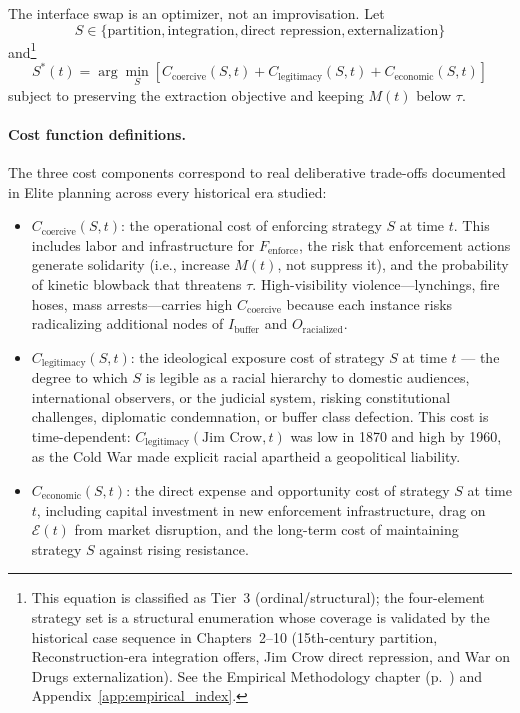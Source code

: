 The interface swap is an optimizer, not an improvisation. Let
\begin{equation}\label{eq:1.6-interface-strategy-set}
S \in \{\text{partition},\text{integration},\text{direct repression},\text{externalization}\}
\end{equation}
and\footnote{This equation is classified as Tier~3 (ordinal/structural); the four-element strategy set is a structural enumeration whose coverage is validated by the historical case sequence in Chapters~2--10 (15th-century partition, Reconstruction-era integration offers, Jim Crow direct repression, and War on Drugs externalization). See the Empirical Methodology chapter (p.~\pageref{ch:empirical_methodology}) and Appendix~\ref{app:empirical_index}.}
\begin{equation}\label{eq:1.7-interface-optimizer}
S^\ast(t) = \arg\min_{S} \left[C_{\text{coercive}}(S,t) + C_{\text{legitimacy}}(S,t) + C_{\text{economic}}(S,t)\right]
\end{equation}
subject to preserving the extraction objective and keeping $M(t)$ below $\tau$.

\paragraph{Cost function definitions.}
The three cost components correspond to real deliberative trade-offs documented in Elite planning across every historical era studied:

\begin{itemize}[leftmargin=*]
    \item $C_{\text{coercive}}(S,t)$: the operational cost of enforcing strategy $S$ at time $t$. This includes labor and infrastructure for $F_{\text{enforce}}$, the risk that enforcement actions generate solidarity (i.e., increase $M(t)$, not suppress it), and the probability of kinetic blowback that threatens $\tau$. High-visibility violence---lynchings, fire hoses, mass arrests---carries high $C_{\text{coercive}}$ because each instance risks radicalizing additional nodes of $I_{\text{buffer}}$ and $O_{\text{racialized}}$.

    \item $C_{\text{legitimacy}}(S,t)$: the ideological exposure cost of strategy $S$ at time $t$ --- the degree to which $S$ is legible as a racial hierarchy to domestic audiences, international observers, or the judicial system, risking constitutional challenges, diplomatic condemnation, or buffer class defection. This cost is time-dependent: $C_{\text{legitimacy}}(\text{Jim Crow}, t)$ was low in 1870 and high by 1960, as the Cold War made explicit racial apartheid a geopolitical liability.

    \item $C_{\text{economic}}(S,t)$: the direct expense and opportunity cost of strategy $S$ at time $t$, including capital investment in new enforcement infrastructure, drag on $\mathcal{E}(t)$ from market disruption, and the long-term cost of maintaining strategy $S$ against rising resistance.
\end{itemize}

